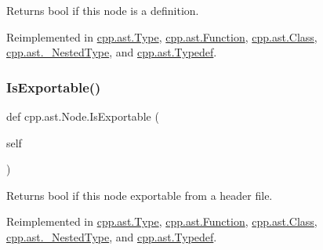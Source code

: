 \begin{DoxyVerb}Returns bool if this node is a definition.\end{DoxyVerb}
 

Reimplemented in \mbox{\hyperlink{classcpp_1_1ast_1_1Type_aedff25dc3736e83388742e55fe29159b}{cpp.\+ast.\+Type}}, \mbox{\hyperlink{classcpp_1_1ast_1_1Function_ad5d96144bd8418ac72332bffb21ea86f}{cpp.\+ast.\+Function}}, \mbox{\hyperlink{classcpp_1_1ast_1_1Class_ae6d2356f835d06d5109d9e4609d86780}{cpp.\+ast.\+Class}}, \mbox{\hyperlink{classcpp_1_1ast_1_1__NestedType_a9f160999863f39c9032f60b014e213d5}{cpp.\+ast.\+\_\+\+Nested\+Type}}, and \mbox{\hyperlink{classcpp_1_1ast_1_1Typedef_a103bf391e665884bfbfd20fc5e6d1a19}{cpp.\+ast.\+Typedef}}.

\mbox{\label{classcpp_1_1ast_1_1Node_a313273874ccf578485006d4000128234}} 
\subsubsection{\texorpdfstring{IsExportable()}{IsExportable()}}
{\footnotesize\ttfamily def cpp.\+ast.\+Node.\+Is\+Exportable (\begin{DoxyParamCaption}\item[{}]{self }\end{DoxyParamCaption})}

\begin{DoxyVerb}Returns bool if this node exportable from a header file.\end{DoxyVerb}
 

Reimplemented in \mbox{\hyperlink{classcpp_1_1ast_1_1Type_a80dce781581c03e550ce51a9a33ca158}{cpp.\+ast.\+Type}}, \mbox{\hyperlink{classcpp_1_1ast_1_1Function_a85a073cd69116bc6191f379d69d10d72}{cpp.\+ast.\+Function}}, \mbox{\hyperlink{classcpp_1_1ast_1_1Class_a1ab749f8cfddb0903c6484791f70f42e}{cpp.\+ast.\+Class}}, \mbox{\hyperlink{classcpp_1_1ast_1_1__NestedType_a689f8b0dc20e6070938825eee483dd2f}{cpp.\+ast.\+\_\+\+Nested\+Type}}, and \mbox{\hyperlink{classcpp_1_1ast_1_1Typedef_adee58e4674b049d8e4435b5b6ad8e1d4}{cpp.\+ast.\+Typedef}}.

\mbox{\label{classcpp_1_1ast_1_1Node_a31ae211f954a8c578ef16226df5ac8c8}} 
